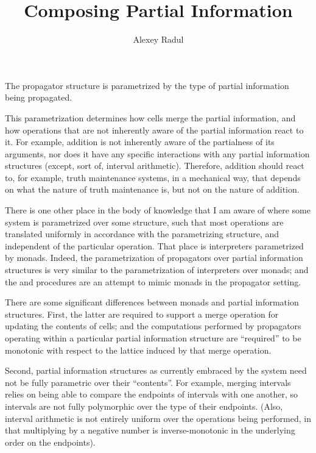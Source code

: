 \documentclass[12pt,letterpaper]{article}
\author{Alexey Radul}
\title{Composing Partial Information}
\begin{document}
\maketitle

The propagator structure is parametrized by the type of partial
information being propagated.

This parametrization determines how cells merge the partial
information, and how operations that are not inherently aware of the
partial information react to it.  For example, addition is not
inherently aware of the partialness of its arguments, nor does it have
any specific interactions with any partial information structures
(except, sort of, interval arithmetic).  Therefore, addition should
react to, for example, truth maintenance systems, in a mechanical way,
that depends on what the nature of truth maintenance is, but not on
the nature of addition.

There is one other place in the body of knowledge that I am aware of
where some system is parametrized over some structure, such that most
operations are translated uniformly in accordance with the
parametrizing structure, and independent of the particular operation.
That place is interpreters parametrized by monads.\cite{?}  Indeed,
the parametrization of propagators over partial information structures
is very similar to the parametrization of interpreters over monads;
and the  and  procedures
are an attempt to mimic monads in the propagator setting.

There are some significant differences between monads and partial
information structures.  First, the latter are required to support a
merge operation for updating the contents of cells; and the
computations performed by propagators operating within a particular
partial information structure are ``required'' to be monotonic with
respect to the lattice induced by that merge operation.  

Second, partial information structures as currently embraced by the
system need not be fully parametric over their ``contents''.  For
example, merging intervals relies on being able to compare the
endpoints of intervals with one another, so intervals are not fully
polymorphic over the type of their endpoints.  (Also, interval
arithmetic is not entirely uniform over the operations being
performed, in that multiplying by a negative number is
inverse-monotonic in the underlying order on the endpoints).
\end{document}
